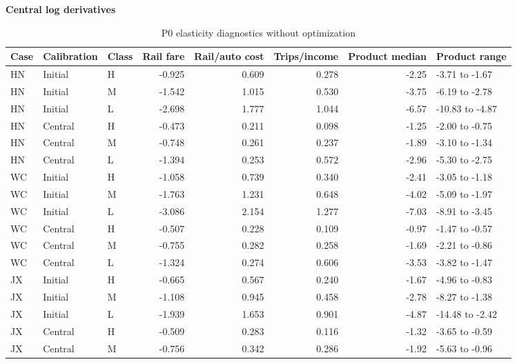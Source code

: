 \begin{table}[htbp]\centering
\caption{P0 elasticity diagnostics without optimization}\label{tab:review_elasticities}
\begin{minipage}{.95\textwidth}\fontsize{8}{10}\selectfont{}\setlength{\tabcolsep}{2pt}\renewcommand{\arraystretch}{1.08}
\par\noindent\textbf{Central log derivatives}\par\smallskip
\begin{tabular*}{\linewidth}{@{\extracolsep{\fill}}lllrrrrl@{}}\toprule
Case & Calibration & Class & Rail fare & Rail/auto cost & Trips/income & Product median & Product range \\
\midrule
HN & Initial & H & -0.925 & 0.609 & 0.278 & -2.25 & -3.71 to -1.67 \\
HN & Initial & M & -1.542 & 1.015 & 0.530 & -3.75 & -6.19 to -2.78 \\
HN & Initial & L & -2.698 & 1.777 & 1.044 & -6.57 & -10.83 to -4.87 \\
HN & Central & H & -0.473 & 0.211 & 0.098 & -1.25 & -2.00 to -0.75 \\
HN & Central & M & -0.748 & 0.261 & 0.237 & -1.89 & -3.10 to -1.34 \\
HN & Central & L & -1.394 & 0.253 & 0.572 & -2.96 & -5.30 to -2.75 \\
WC & Initial & H & -1.058 & 0.739 & 0.340 & -2.41 & -3.05 to -1.18 \\
WC & Initial & M & -1.763 & 1.231 & 0.648 & -4.02 & -5.09 to -1.97 \\
WC & Initial & L & -3.086 & 2.154 & 1.277 & -7.03 & -8.91 to -3.45 \\
WC & Central & H & -0.507 & 0.228 & 0.109 & -0.97 & -1.47 to -0.57 \\
WC & Central & M & -0.755 & 0.282 & 0.258 & -1.69 & -2.21 to -0.86 \\
WC & Central & L & -1.324 & 0.274 & 0.606 & -3.53 & -3.82 to -1.47 \\
JX & Initial & H & -0.665 & 0.567 & 0.240 & -1.67 & -4.96 to -0.83 \\
JX & Initial & M & -1.108 & 0.945 & 0.458 & -2.78 & -8.27 to -1.38 \\
JX & Initial & L & -1.939 & 1.653 & 0.901 & -4.87 & -14.48 to -2.42 \\
JX & Central & H & -0.509 & 0.283 & 0.116 & -1.32 & -3.65 to -0.59 \\
JX & Central & M & -0.756 & 0.342 & 0.286 & -1.92 & -5.63 to -0.96 \\

\end{tabular*}
\end{minipage}
\end{table}
